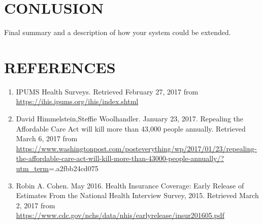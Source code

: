 \documentclass[10pt,]{article}
\begin{document}
\section{CONLUSION}\label{conlusion}

Final summary and a description of how your system could be extended.

\section{REFERENCES}\label{references}

\begin{enumerate}
\def\labelenumi{\arabic{enumi}.}
\item
  IPUMS Health Surveys. Retrieved February 27, 2017 from
  \url{https://ihis.ipums.org/ihis/index.shtml}
\item
  David Himmelstein,Steffie Woolhandler. January 23, 2017. Repealing the
  Affordable Care Act will kill more than 43,000 people annually.
  Retrieved March 6, 2017 from
  \url{https://www.washingtonpost.com/posteverything/wp/2017/01/23/repealing-the-affordable-care-act-will-kill-more-than-43000-people-annually/?utm_term}=.a2fbb24cd075
\item
  Robin A. Cohen. May 2016. Health Insurance Coverage: Early Release of
  Estimates From the National Health Interview Survey, 2015. Retrieved
  March 2, 2017 from
  \url{https://www.cdc.gov/nchs/data/nhis/earlyrelease/insur201605.pdf}
\end{enumerate}
\newpage
\singlespacing 
\end{document}
